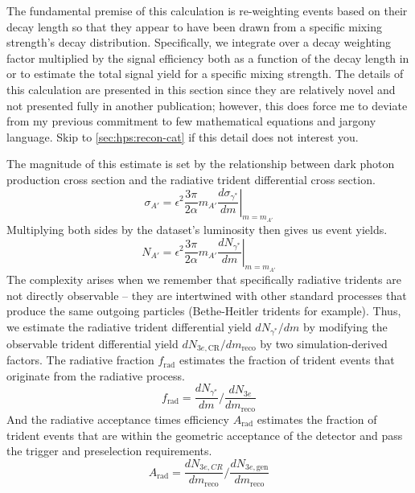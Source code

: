 The fundamental premise of this calculation is re-weighting events based on their decay length
so that they appear to have been drawn from a specific mixing strength's decay distribution.
Specifically, we integrate over a decay weighting factor multiplied by the signal efficiency
both as a function of the decay length in or to estimate the total signal yield for a specific
mixing strength.
The details of this calculation are presented in this section since they are relatively novel and
not presented fully in another publication; however, this does force me to deviate from my previous
commitment to few mathematical equations and jargony language.
Skip to \cref{sec:hps:recon-cat} if this detail does not interest you.

The magnitude of this estimate is set by the relationship between dark photon production cross section
and the radiative trident differential cross section\cite{bjorken-ap-rate:2009}.
\begin{equation}
  \sigma_{A'} = \epsilon^2\frac{3\pi}{2\alpha} m_{A'} \left.\frac{d\sigma_{\gamma^*}}{dm}\right|_{m=m_{A'}}
\end{equation}
Multiplying both sides by the dataset's luminosity then gives us event yields.
\begin{equation}
  N_{A'} = \epsilon^2\frac{3\pi}{2\alpha} m_{A'} \left.\frac{dN_{\gamma^*}}{dm}\right|_{m=m_{A'}}
\end{equation}
The complexity arises when we remember that specifically radiative tridents are not
directly observable -- they are intertwined with other standard processes that produce
the same outgoing particles (Bethe-Heitler tridents for example).
Thus, we estimate the radiative trident differential yield $dN_{\gamma^*}/dm$ by
modifying the observable trident differential yield $dN_{3e\mathrm{,CR}}/dm_\mathrm{reco}$ by
two simulation-derived factors.
The radiative fraction $f_\mathrm{rad}$ estimates the fraction of trident events
that originate from the radiative process.
\begin{equation}
  f_\mathrm{rad} = \frac{dN_{\gamma^*}}{dm} \bigg/ \frac{dN_{3e}}{dm_\mathrm{reco}}
\end{equation}
And the radiative acceptance times efficiency $A_\mathrm{rad}$ estimates the
fraction of trident events that are within the geometric acceptance of the detector
and pass the trigger and preselection requirements.
\begin{equation}
  A_\mathrm{rad} = \frac{dN_{3e,CR}}{dm_\mathrm{reco}} \bigg/ \frac{dN_{3e,\mathrm{gen}}}{dm_\mathrm{reco}}
\end{equation}
